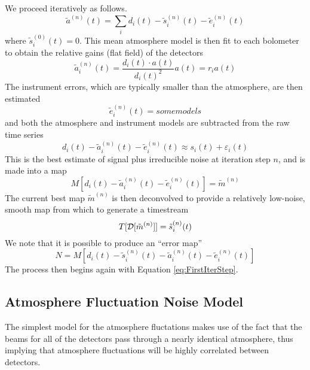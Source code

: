\documentclass[12pt,preprint]{aastex}
\newcommand{\epsi}{\varepsilon}
\def\Figure#1#2#3#4{
\begin{figure}[htb]
\epsscale{#4}
\plotone{#1}
\caption{#2}
\label{#3}
\end{figure}
}
\begin{document}
We proceed iteratively as follows. 
\begin{equation}
\label{eq:FirstIterStep}
\tilde{a}^{(n)}(t) = 
\sum_i{d_i(t)-\tilde{s}^{(n)}_i(t) - \tilde{e}^{(n)}_i(t)}
\end{equation}
where $\tilde{s}^{(0)}_i(t)=0$.  This mean atmosphere model is then
fit to each bolometer to obtain the relative gains (flat field) of the
detectors
\begin{equation}
\tilde{a}^{(n)}_i(t) = \frac{d_i(t) \cdot a(t)}{d_i(t)^2} a(t) = r_i a(t)
\end{equation}
The instrument errors, which are typically smaller than the
atmosphere, are then estimated
\begin{equation}
\tilde{e}^{(n)}_i(t) = some models
\end{equation}
and both the atmosphere and instrument models are subtracted from the
raw time series
\begin{equation}
d_i(t) - \tilde{a}^{(n)}_i(t) - \tilde{e}^{(n)}_i(t)
\approx s_i(t) + \epsi_i(t)
\end{equation}
This is the best estimate of signal plus irreducible noise at
iteration step $n$, and is made into a map
\begin{equation}
M[d_i(t) - \tilde{a}^{(n)}_i(t) - \tilde{e}^{(n)}_i(t)] = \tilde{m}^{(n)}
\end{equation}
The current best map $\tilde{m}^{(n)}$ is then deconvolved to provide
a relatively low-noise, smooth map from which to generate a timestream
\begin{equation}
T[{\cal D}[\tilde{m}^{(n)}]] = \tilde{s}^{(n)}_i(t)
\end{equation}
We note that it is possible to produce an ``error map''
\begin{equation}
N = M[d_i(t) - \tilde{s}^{(n)}_i(t) - \tilde{a}^{(n)}_i(t) - 
\tilde{e}^{(n)}_i(t)]
\end{equation}
The process then begins again with Equation \ref{eq:FirstIterStep}.


\subsection{Atmosphere Fluctuation Noise Model}

The simplest model for the atmosphere fluctations makes use of the
fact that the beams for all of the detectors pass through a nearly
identical atmosphere, thus implying that atmosphere fluctuations will
be highly correlated between detectors.
\end{document}
